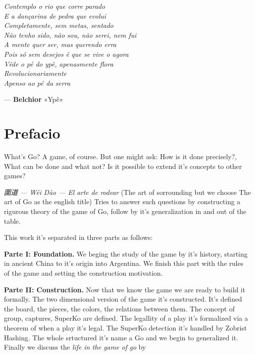 \begin{center}
	\begin{minipage}{6.375cm}
		\linespread{1.3}\selectfont
		\itshape
		Contemplo o rio que corre parado \\
		E a dançarina de pedra que evolui \\
		Completamente, sem metas, sentado \\
		Não tenho sido, não sou, não serei, nem fui \\
		A mente quer ser, mas querendo erra \\
		Pois só sem desejos é que se vive o agora\\
		Vêde o pé do ypê, apenasmente flora\\
		Revolucionariamente\\
		Apenso ao pé da serra
		
		\vspace{1.5em}
		\hfill \upshape  --- \textbf{Belchior} «Ypê»
	\end{minipage}
\end{center}
\vfill %
\clearpage
\thispagestyle{empty}
\section*{Prefacio}
\thispagestyle{empty}
What's Go? A game, of course. But one might ask: How is it done precisely?, What can be done and what not? Is it possible to extend it's concepts to other games?


\textit{圍道 — Wéi Dào — El arte de rodear} (The art of sorrounding but we choose The art of Go as the english title) Tries to answer such questions by constructing a rigurous theory of the game of Go, follow by it's generalization in and out of the table.

This work it's separated in three parts as follows:

\textbf{Parte I: Foundation.} We beging the study of the game by it's history, starting in ancient China to it's origin into Argentina. We finish this part with the rules of the game and setting the construction motivation.


\textbf{Parte II: Construction.} Now that we know the game we are ready to build it formally. The two dimensional version of the game it's constructed. It's defined the board, the pieces, the colors, the relations between them. The concept of group, captures, SuperKo are defined. The legallity of a play it's formalized via a theorem of when a play it's legal. The SuperKo detection it's handled by Zobrist Hashing. The whole srtuctured it's name a Go and we begin to generalized it. Finally we discuss the \textit{life in the game of go} by 

